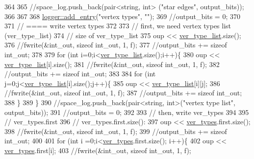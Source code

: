 \begin{DoxyCode}
364 
365   \textcolor{comment}{//space\_log.push\_back(pair<string, int> ("star edges", output\_bits));}
366 
367 
368   \hyperlink{classlogger_a710163deb17bc81f70d53d285b8ac9ac}{logger::add\_entry}(\textcolor{stringliteral}{"vertex types"}, \textcolor{stringliteral}{""});
369   \textcolor{comment}{//output\_bits = 0;}
370   
371   \textcolor{comment}{// ==== write vertex types}
372 
373   \textcolor{comment}{// first, we need vertex types list (ver\_type\_list)}
374   \textcolor{comment}{// size of ver\_type\_list}
375   oup <<  \hyperlink{classmarked__graph__compressed_af2e3e55223d436628a02758dfae88493}{ver\_type\_list}.size();
376   \textcolor{comment}{//fwrite(&int\_out, sizeof int\_out, 1, f);}
377   \textcolor{comment}{//output\_bits += sizeof int\_out;}
378 
379   \textcolor{keywordflow}{for} (\textcolor{keywordtype}{int} i=0;i<\hyperlink{classmarked__graph__compressed_af2e3e55223d436628a02758dfae88493}{ver\_type\_list}.size();i++)\{
380     oup << \hyperlink{classmarked__graph__compressed_af2e3e55223d436628a02758dfae88493}{ver\_type\_list}[i].size();
381     \textcolor{comment}{//fwrite(&int\_out, sizeof int\_out, 1, f);}
382     \textcolor{comment}{//output\_bits += sizeof int\_out;}
383 
384     \textcolor{keywordflow}{for} (\textcolor{keywordtype}{int} j=0;j<\hyperlink{classmarked__graph__compressed_af2e3e55223d436628a02758dfae88493}{ver\_type\_list}[i].size();j++)\{
385       oup << \hyperlink{classmarked__graph__compressed_af2e3e55223d436628a02758dfae88493}{ver\_type\_list}[i][j];
386       \textcolor{comment}{//fwrite(&int\_out, sizeof int\_out, 1, f);}
387       \textcolor{comment}{//output\_bits += sizeof int\_out;}
388     \}
389   \}
390   \textcolor{comment}{//space\_log.push\_back(pair<string, int>("vertex type list", output\_bits));}
391   \textcolor{comment}{//output\_bits = 0;}
392   
393   \textcolor{comment}{// then, write ver\_types}
394 
395   \textcolor{comment}{// ver\_types.first}
396   \textcolor{comment}{// ver\_types.first.size():}
397   oup << \hyperlink{classmarked__graph__compressed_af446cc5e23c241a92b76642fd5ebc403}{ver\_types}.first.size();
398   \textcolor{comment}{//fwrite(&int\_out, sizeof int\_out, 1, f);}
399   \textcolor{comment}{//output\_bits += sizeof int\_out;}
400 
401   \textcolor{keywordflow}{for} (\textcolor{keywordtype}{int} i =0;i<\hyperlink{classmarked__graph__compressed_af446cc5e23c241a92b76642fd5ebc403}{ver\_types}.first.size(); i++)\{
402     oup <<  \hyperlink{classmarked__graph__compressed_af446cc5e23c241a92b76642fd5ebc403}{ver\_types}.first[i];
403     \textcolor{comment}{//fwrite(&int\_out, sizeof int\_out, 1, f);}

\end{DoxyCode}
